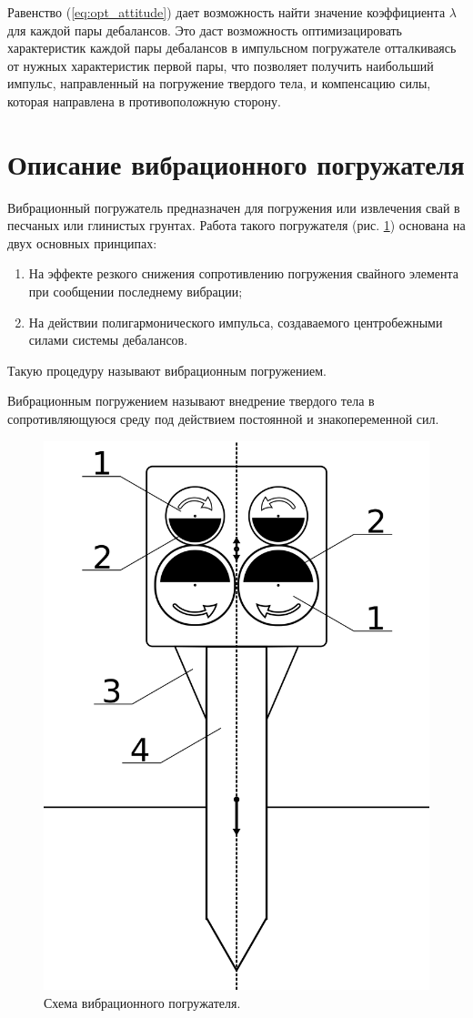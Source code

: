Равенство (\ref{eq:opt_attitude}) дает возможность найти значение коэффициента $\lambda$ для каждой пары дебалансов.
Это даст возможность оптимизацировать характеристик каждой пары дебалансов
в импульсном погружателе отталкиваясь от нужных характеристик первой пары, что позволяет получить наибольший импульс,
направленный на погружение твердого тела, и компенсацию силы, которая направлена в противоположную сторону.

\clearpage
\section{Описание вибрационного погружателя}
\label{chapter:pogr}

Вибрационный погружатель предназначен для погружения или извлечения свай в песчаных или глинистых грунтах.
Работа такого погружателя (рис. \ref{fig:scheme_porg}) основана на двух основных принципах:
\begin{enumerate} 
    \item На эффекте резкого снижения сопротивлению погружения свайного элемента при сообщении последнему вибрации;
    \item На действии полигармонического импульса, создаваемого центробежными силами системы дебалансов.
\end{enumerate}

Такую процедуру называют вибрационным погружением.

\begin{definition}
    Вибрационным погружением называют внедрение твердого тела в сопротивляющуюся среду под действием постоянной и знакопеременной сил.
\end{definition}

\begin{figure}[h]
    \centering
    \includegraphics[width=0.5\linewidth]{img/scheme_porg_2.png}
    \caption{Схема вибрационного погружателя.}
    \label{fig:scheme_porg}
\end{figure}

